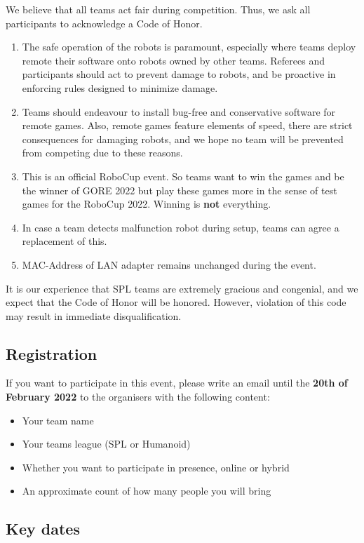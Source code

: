 We believe that all teams act fair during competition. Thus, we ask all participants to acknowledge a Code of Honor.
\begin{enumerate}
    \item The safe operation of the robots is paramount, especially where teams deploy remote their software onto robots owned by other teams. Referees and participants should act to prevent damage to robots, and be proactive in enforcing rules  designed to minimize damage.
    \item Teams should endeavour to install bug-free and conservative software for remote games. Also, remote games feature elements of speed, there are strict consequences for damaging robots, and we hope no team will be prevented from competing due to these reasons.
    \item This is an official RoboCup event. So teams want to win the games and be the winner of GORE 2022 but play these games more in the sense of test games for the RoboCup 2022. Winning is \textbf{not} everything.
    \item In case a team detects malfunction robot during setup, teams can agree a replacement of this.
    \item MAC-Address of LAN adapter remains unchanged during the event.
\end{enumerate} 

It is our experience that SPL teams are extremely gracious and congenial, and we expect that the Code of Honor will be honored. However, violation of this code may result in immediate disqualification.

\subsection{Registration}

If you want to participate in this event, please write an email until the \textbf{20th of February 2022} to the organisers with the following content:
\begin{itemize}
	\item Your team name
	\item Your teams league (SPL or Humanoid)
	\item Whether you want to participate in presence, online or hybrid
	\item An approximate count of how many people you will bring
\end{itemize}

\subsection{Key dates}


